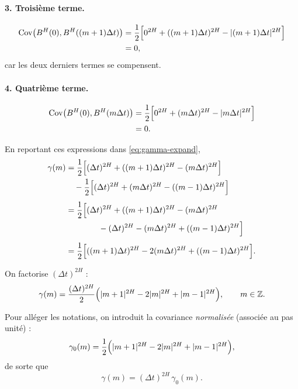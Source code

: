 \documentclass[11pt,a4paper]{article}
\newcommand{\Cov}{\mathrm{Cov}}
\newcommand{\1}{\mathbf{1}}
\newcommand{\bH}{B^{H}}
\begin{document}
\paragraph{3. Troisième terme.}
\begin{align}
  \Cov\bigl(\bH(0),\bH((m+1)\Delta t)\bigr)
  &= \frac{1}{2}\Bigl[0^{2H}
  + ((m+1)\Delta t)^{2H}
  - |(m+1)\Delta t|^{2H}\Bigr] \\
  &= 0,
\end{align}
car les deux derniers termes se compensent.

\paragraph{4. Quatrième terme.}
\begin{align}
  \Cov\bigl(\bH(0),\bH(m\Delta t)\bigr)
  &= \frac{1}{2}\Bigl[0^{2H}
  + (m\Delta t)^{2H}
  - |m\Delta t|^{2H}\Bigr] \\
  &= 0.
\end{align}

En reportant ces expressions dans \eqref{eq:gamma-expand},
\begin{align}
  \gamma(m)
  &= \frac{1}{2}\Bigl[(\Delta t)^{2H}
  + ((m+1)\Delta t)^{2H}
  - (m\Delta t)^{2H}\Bigr] \\
  &\quad - \frac{1}{2}\Bigl[(\Delta t)^{2H}
  + (m\Delta t)^{2H}
  - ((m-1)\Delta t)^{2H}\Bigr] \\[0.4em]
  &= \frac{1}{2}\Bigl[(\Delta t)^{2H}
                      + ((m+1)\Delta t)^{2H}
                      - (m\Delta t)^{2H} \\
  &\qquad\qquad
        - (\Delta t)^{2H}
        - (m\Delta t)^{2H}
        + ((m-1)\Delta t)^{2H}\Bigr] \\[0.4em]
  &= \frac{1}{2}\Bigl[((m+1)\Delta t)^{2H}
        - 2(m\Delta t)^{2H}
        + ((m-1)\Delta t)^{2H}\Bigr].
\end{align}

On factorise $(\Delta t)^{2H}$ :
\begin{equation}
  \gamma(m)
  = \frac{(\Delta t)^{2H}}{2}
    \Bigl(|m+1|^{2H} - 2|m|^{2H} + |m-1|^{2H}\Bigr),
  \qquad m\in\mathbb{Z}.
\end{equation}

Pour alléger les notations, on introduit la covariance \emph{normalisée}
(associée au pas unité) :
\begin{equation}
  \gamma_0(m)
  = \frac{1}{2}\Bigl(|m+1|^{2H} - 2|m|^{2H} + |m-1|^{2H}\Bigr),
\end{equation}
de sorte que
\begin{equation}
  \gamma(m) = (\Delta t)^{2H}\,\gamma_0(m).
\end{equation}
\end{document}
